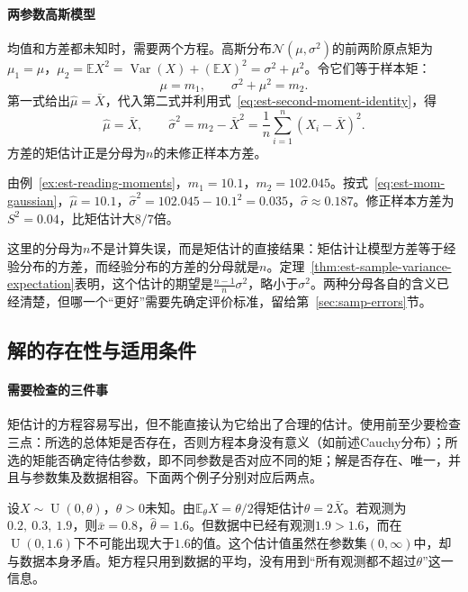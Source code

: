 \paragraph{两参数高斯模型}
均值和方差都未知时，需要两个方程。高斯分布$\mathcal{N}(\mu,\sigma^2)$的前两阶原点矩为$\mu_1=\mu$，$\mu_2=\mathbb{E}X^2=\operatorname{Var}(X)+(\mathbb{E}X)^2=\sigma^2+\mu^2$。令它们等于样本矩：
\[
\mu=m_1,\qquad \sigma^2+\mu^2=m_2 .
\]
第一式给出$\hat\mu=\bar X$，代入第二式并利用式~\eqref{eq:est-second-moment-identity}，得
\begin{equation}
\label{eq:est-mom-gaussian}
\hat\mu=\bar X,\qquad \hat\sigma^2=m_2-\bar X^2=\frac1n\sum_{i=1}^n(X_i-\bar X)^2 .
\end{equation}
方差的矩估计正是分母为$n$的未修正样本方差。

\begin{example}[读数的矩估计]
\label{ex:est-mom-readings}
由例~\ref{ex:est-reading-moments}，$m_1=10.1$，$m_2=102.045$。按式~\eqref{eq:est-mom-gaussian}，$\hat\mu=10.1$，$\hat\sigma^2=102.045-10.1^2=0.035$，$\hat\sigma\approx0.187$。修正样本方差为$S^2=0.04$，比矩估计大$8/7$倍。
\end{example}

这里的分母为$n$不是计算失误，而是矩估计的直接结果：矩估计让模型方差等于经验分布的方差，而经验分布的方差的分母就是$n$。定理~\ref{thm:est-sample-variance-expectation}表明，这个估计的期望是$\frac{n-1}{n}\sigma^2$，略小于$\sigma^2$。两种分母各自的含义已经清楚，但哪一个“更好”需要先确定评价标准，留给第~\ref{sec:samp-errors}节。

\subsection{解的存在性与适用条件}

\paragraph{需要检查的三件事}
矩估计的方程容易写出，但不能直接认为它给出了合理的估计。使用前至少要检查三点：所选的总体矩是否存在，否则方程本身没有意义（如前述Cauchy分布）；所选的矩能否确定待估参数，即不同参数是否对应不同的矩；解是否存在、唯一，并且与参数集及数据相容。下面两个例子分别对应后两点。

\begin{example}[解与数据矛盾]
\label{ex:est-mom-uniform}
设$X\sim\operatorname{U}(0,\theta)$，$\theta>0$未知。由$\mathbb{E}_\theta X=\theta/2$得矩估计$\hat\theta=2\bar X$。若观测为$0.2,\ 0.3,\ 1.9$，则$\bar x=0.8$，$\hat\theta=1.6$。但数据中已经有观测$1.9>1.6$，而在$\operatorname{U}(0,1.6)$下不可能出现大于$1.6$的值。这个估计值虽然在参数集$(0,\infty)$中，却与数据本身矛盾。矩方程只用到数据的平均，没有用到“所有观测都不超过$\theta$”这一信息。
\end{example}

